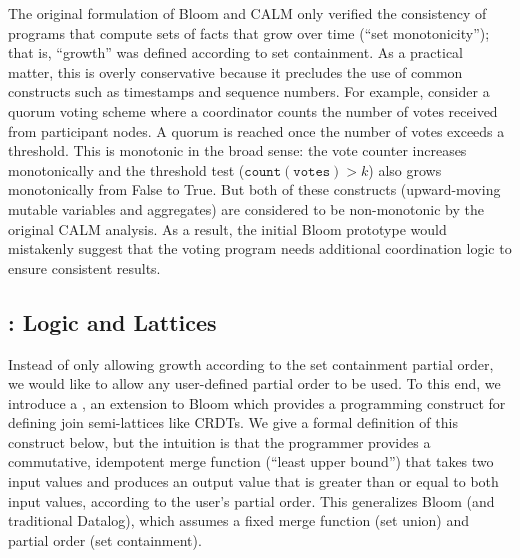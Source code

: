 The original formulation of Bloom and CALM only verified the consistency of
programs that compute sets of facts that grow over time (``set monotonicity'');
that is, ``growth'' was defined according to set containment. As a practical
matter, this is overly conservative because it precludes the use of common
constructs such as timestamps and sequence numbers. For example, consider a
quorum voting scheme where a coordinator counts the number of votes received
from participant nodes. A quorum is reached once the number of votes exceeds a
threshold. This is monotonic in the broad sense: the vote counter increases
monotonically and the threshold test ($\mathtt{count(votes)} > k$) also grows
monotonically from False to True. But both of these constructs (upward-moving
mutable variables and aggregates) are considered to be non-monotonic by the
original CALM analysis.  As a result, the initial Bloom prototype would
mistakenly suggest that the voting program needs additional coordination logic
to ensure consistent results.

\pagebreak
\subsection{\lang: Logic and Lattices}
Instead of only allowing growth according to the set containment partial order,
we would like to allow any user-defined partial order to be used.  To this end,
we introduce a \lang, an extension to Bloom which provides a programming
construct for defining join semi-lattices like CRDTs.  We give a formal
definition of this construct below, but the intuition is that the programmer
provides a commutative, idempotent merge function (``least upper bound'') that
takes two input values and produces an output value that is greater than or
equal to both input values, according to the user's partial order. This
generalizes Bloom (and traditional Datalog), which assumes a fixed merge
function (set union) and partial order (set containment).

